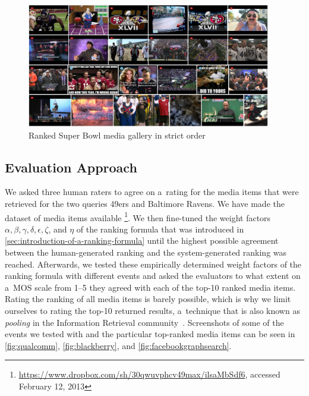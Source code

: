 \begin{figure}
  \centering
  \includegraphics[width=0.95\textwidth,height=0.9\textheight,keepaspectratio]{strict_order.png}
  \caption[Ranked Super Bowl media gallery in strict order]
  {Ranked Super Bowl media gallery in strict order }
  \label{fig:strict_order}
\end{figure}  

\subsection{Evaluation Approach}

We asked three human raters to agree on a~rating for the media items
that were retrieved for the two queries 49ers and Baltimore Ravens.
We have made the dataset of media items available%
\footnote{\url{https://www.dropbox.com/sh/30qwuvphcv49max/ilsaMbSdf6},
accessed February 12, 2013}.
We then fine-tuned the weight factors
$ \alpha, \beta, \gamma, \delta, \epsilon, \zeta $, and $ \eta $ of the ranking formula
that was introduced in \autoref{sec:introduction-of-a-ranking-formula}
until the highest possible agreement between the human-generated ranking
and the system-generated ranking was reached.
Afterwards, we tested these empirically determined weight factors of the ranking formula
with different events and asked the evaluators to what extent
on a~MOS scale from 1--5 they agreed with each of the top-10 ranked media items.
Rating the ranking of all media items is barely possible,
which is why we limit ourselves to rating the top-10 returned results,
a~technique that is also known as \emph{pooling}
in the Information Retrieval community~\cite{liu2009learningtorank}.
Screenshots of some of the events we tested with
and the particular top-ranked media items can be seen in 
\autoref{fig:qualcomm}, \autoref{fig:blackberry}, and \autoref{fig:facebookgraphsearch}.

